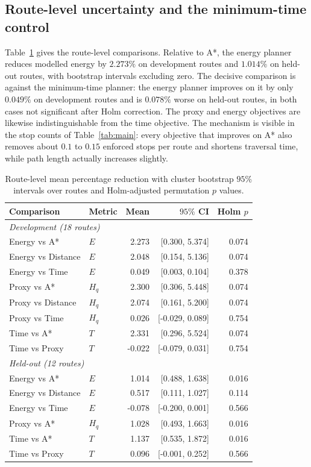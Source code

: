 \documentclass[conference]{IEEEtran}
\begin{document}
\subsection{Route-level uncertainty and the minimum-time control}
Table~\ref{tab:routelevel} gives the route-level comparisons. Relative to A*,
the energy planner reduces modelled energy by $2.273\%$ on development routes
and $1.014\%$ on held-out routes, with bootstrap intervals excluding zero. The
decisive comparison is against the minimum-time planner: the energy planner
improves on it by only $0.049\%$ on development routes and is $0.078\%$ worse on
held-out routes, in both cases not significant after Holm correction. The proxy
and energy objectives are likewise indistinguishable from the time objective.
The mechanism is visible in the stop counts of Table~\ref{tab:main}: every
objective that improves on A* also removes about $0.1$ to $0.15$ enforced stops
per route and shortens traversal time, while path length actually increases
slightly.

\begin{table}[t]
\caption{Route-level mean percentage reduction with cluster bootstrap $95\%$
intervals over routes and Holm-adjusted permutation $p$ values.}
\label{tab:routelevel}
\centering
\small
\begin{tabular}{llrrr}
\toprule
Comparison & Metric & Mean & $95\%$ CI & Holm $p$ \\
\midrule
\multicolumn{5}{l}{\textit{Development (18 routes)}}\\
Energy vs A*        & $E$   & 2.273 & [0.300, 5.374] & 0.074 \\
Energy vs Distance  & $E$   & 2.048 & [0.154, 5.136] & 0.074 \\
Energy vs Time      & $E$   & 0.049 & [0.003, 0.104] & 0.378 \\
Proxy vs A*         & $H_q$ & 2.300 & [0.306, 5.448] & 0.074 \\
Proxy vs Distance   & $H_q$ & 2.074 & [0.161, 5.200] & 0.074 \\
Proxy vs Time       & $H_q$ & 0.026 & [-0.029, 0.089] & 0.754 \\
Time vs A*          & $T$   & 2.331 & [0.296, 5.524] & 0.074 \\
Time vs Proxy       & $T$   & -0.022 & [-0.079, 0.031] & 0.754 \\
\midrule
\multicolumn{5}{l}{\textit{Held-out (12 routes)}}\\
Energy vs A*        & $E$   & 1.014 & [0.488, 1.638] & 0.016 \\
Energy vs Distance  & $E$   & 0.517 & [0.111, 1.027] & 0.114 \\
Energy vs Time      & $E$   & -0.078 & [-0.200, 0.001] & 0.566 \\
Proxy vs A*         & $H_q$ & 1.028 & [0.493, 1.663] & 0.016 \\
Time vs A*          & $T$   & 1.137 & [0.535, 1.872] & 0.016 \\
Time vs Proxy       & $T$   & 0.096 & [-0.001, 0.252] & 0.566 \\
\bottomrule
\end{tabular}
\end{table}
\end{document}
